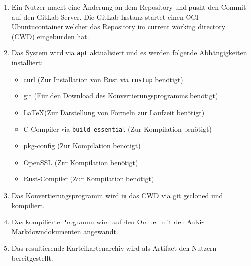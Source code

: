 \documentclass[ngerman]{article}
\begin{document}
\begin{enumerate}
  \item Ein Nutzer macht eine Änderung an dem Repository und pusht den Commit auf den GitLab-Server. Die GitLab-Instanz startet einen OCI-Ubuntucontainer welcher das Repository im current working directory (CWD) eingebunden hat.
  \item Das System wird via \texttt{apt} aktualisiert und es werden folgende Abhängigkeiten installiert:
    \begin{itemize}
      \item curl (Zur Installation von Rust via \texttt{rustup} benötigt)
      \item git (Für den Download des Konvertierungsprogramms benötigt)
      \item \LaTeX (Zur Darstellung von Formeln zur Laufzeit benötigt)
      \item C-Compiler via \texttt{build-essential} (Zur Kompilation benötigt)
      \item pkg-config (Zur Kompilation benötigt)
      \item OpenSSL (Zur Kompilation benötigt)
      \item Rust-Compiler (Zur Kompilation benötigt)
    \end{itemize}
  \item Das Konvertierungsprogramm wird in das CWD via git gecloned und kompiliert.
  \item Das kompilierte Programm wird auf den Ordner mit den Anki-Markdowndokumenten angewandt.
  \item Das resultierende Karteikartenarchiv wird als Artifact den Nutzern bereitgestellt.
\end{enumerate}
\end{document}
